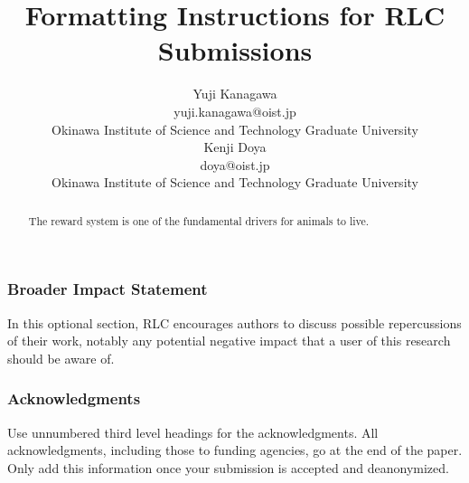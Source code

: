 \documentclass[10pt]{article} %
\title{Formatting Instructions for RLC Submissions}
\author{Yuji Kanagawa  \\
    yuji.kanagawa@oist.jp \\
    Okinawa Institute of Science and Technology Graduate University \\
    \And
    Kenji Doya \\
    doya@oist.jp\\
    Okinawa Institute of Science and Technology Graduate University
}
\newcounter{num}
\begin{document}
\maketitle

\begin{abstract}
  The reward system is one of the fundamental drivers for animals to live.
\end{abstract}



\subsubsection*{Broader Impact Statement}
\label{sec:broaderImpact}
In this optional section, RLC encourages authors to discuss possible repercussions of their work, notably any potential negative impact that a user of this research should be aware of.

\subsubsection*{Acknowledgments}
\label{sec:ack}
Use unnumbered third level headings for the acknowledgments. All acknowledgments, including those to funding agencies, go at the end of the paper. Only add this information once your submission is accepted and deanonymized.




\appendix

\end{document}
